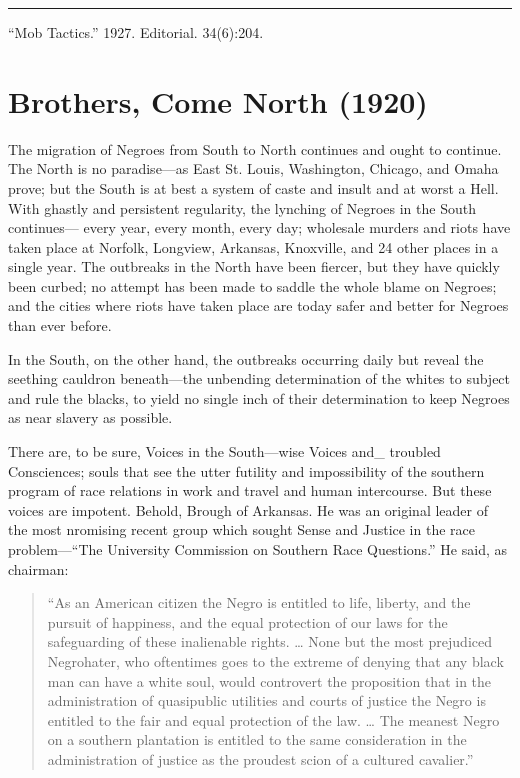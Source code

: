 \documentclass[letterpaper,10pt,english]{jupyterBook}
\begin{document}
\bigskip\hrule\bigskip


\sphinxAtStartPar
{} “Mob Tactics.” 1927. Editorial.  34(6):204.


\section{Brothers, Come North (1920)}
\label{\detokenize{Volumes/19/03/brothers_come_north:brothers-come-north-1920}}\label{\detokenize{Volumes/19/03/brothers_come_north::doc}}
\sphinxAtStartPar
The migration of Negroes from South to North continues and ought to continue. The North is no paradise—as East St. Louis, Washington, Chicago, and Omaha prove; but the South is at best a system of caste and insult and at worst a Hell. With ghastly and persistent regularity, the lynching of Negroes in the South continues— every year, every month, every day; wholesale murders and riots have taken place at Norfolk, Longview, Arkansas, Knoxville, and 24 other places in a single year. The outbreaks in the North have been fiercer, but they have quickly been curbed; no attempt has been made to saddle the whole blame on Negroes; and the cities where riots have taken place are today safer and better for Negroes than ever before.

\sphinxAtStartPar
In the South, on the other hand, the outbreaks occurring daily but reveal the seething cauldron beneath—the unbending determination of the whites to subject and rule the blacks, to yield no single inch of their determination to keep Negroes as near slavery as possible.

\sphinxAtStartPar
There are, to be sure, Voices in the South—wise Voices and\_ troubled Consciences; souls that see the utter futility and impossibility of the southern program of race relations in work and travel and human intercourse. But these voices are impotent. Behold, Brough of Arkansas. He was an original leader of the most nromising recent group which sought Sense and Justice in the race problem—“The University Commission on Southern Race Questions.” He said, as chairman:
\begin{quote}

\sphinxAtStartPar
“As an American citizen the Negro is entitled to life, liberty, and the pursuit of happiness, and the equal protection of our laws for the safeguarding of these inalienable rights. … None but the most prejudiced Negro\sphinxhyphen{}hater, who oftentimes goes to the extreme of denying that any black man can have a white soul, would controvert the proposition that in the administration of quasi\sphinxhyphen{}public utilities and courts of justice the Negro is entitled to the fair and equal protection of the law. … The meanest Negro on a southern plantation is entitled to the same consideration in the administration of justice as the proudest scion of a cultured cavalier.”
\end{quote}
\end{document}
